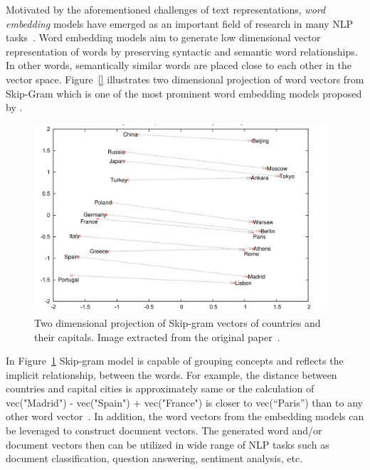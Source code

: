 Motivated by the aforementioned challenges of text representations, \textit{word embedding} models have emerged as an important field of research in many NLP tasks~\cite{survey_word_embeddings}. Word embedding models aim to generate low dimensional vector representation of words by preserving syntactic and semantic word relationships. In other words, semantically similar words are placed close to each other in the vector space. Figure~\ref{} illustrates two dimensional projection of word vectors from Skip-Gram which is one of the most prominent word embedding models proposed by . 
\begin{figure}[t]
 \includegraphics[height=7cm,width=\linewidth]{Figures/fig_word_vec_contries_capitals.png}
 \centering
 \caption{Two dimensional projection of Skip-gram vectors of countries and their capitals. Image extracted from the original paper~\cite{DBLP:conf/nips/MikolovSCCD13}.}
 \label{fig:countries_capitals}
\end{figure} 
In Figure~\ref{fig:countries_capitals} Skip-gram model is capable of grouping concepts and reflects the implicit relationship, between the words. For example, the distance between countries and capital cities is approximately same or the calculation of vec("Madrid") - vec("Spain") + vec("France") is closer to vec(“Paris”) than to any other word vector~\cite{}. %
In addition, the word vectors from the embedding models can be leveraged to construct document vectors. The generated word and/or document vectors then can be utilized in wide range of NLP tasks such as document classification, question answering, sentiment analysis, etc. 

